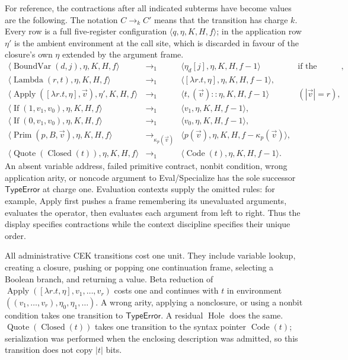 For reference, the contractions after all indicated subterms have become
values are the following.  The notation \(C\longrightarrow_k C'\) means that
the transition has charge \(k\).  Every row is a full five-register
configuration \(\langle q,\eta,K,H,f\rangle\); in the application row
\(\eta'\) is the ambient environment at the call site, which is discarded in
favour of the closure's own \(\eta\) extended by the argument frame.
\[
\begin{array}{rcll}
\langle\operatorname{BoundVar}(d,j),\eta,K,H,f\rangle
 &\longrightarrow_1&\langle\eta_d[j],\eta,K,H,f-1\rangle
 &\text{if the address exists},\\
\langle\operatorname{Lambda}(r,t),\eta,K,H,f\rangle
 &\longrightarrow_1&\langle[\lambda r.t,\eta],\eta,K,H,f-1\rangle,&\\
\langle\operatorname{Apply}([\lambda r.t,\eta],\vec v),\eta',K,H,f\rangle
 &\longrightarrow_1&\langle t,(\vec v)::\eta,K,H,f-1\rangle
 &(|\vec v|=r),\\
\langle\operatorname{If}(1,v_1,v_0),\eta,K,H,f\rangle
 &\longrightarrow_1&\langle v_1,\eta,K,H,f-1\rangle,&\\
\langle\operatorname{If}(0,v_1,v_0),\eta,K,H,f\rangle
 &\longrightarrow_1&\langle v_0,\eta,K,H,f-1\rangle,&\\
\langle\operatorname{Prim}(p,B,\vec v),\eta,K,H,f\rangle
 &\longrightarrow_{\kappa_p(\vec v)}&
 \langle p(\vec v),\eta,K,H,f-\kappa_p(\vec v)\rangle,&\\
\langle\operatorname{Quote}(\operatorname{Closed}(t)),\eta,K,H,f\rangle
 &\longrightarrow_1&\langle\operatorname{Code}(t),\eta,K,H,f-1\rangle.&
\end{array}
\tag{8.2}\label{eq:cek-core}
\]
An absent variable address, failed primitive contract, nonbit condition,
wrong application arity, or noncode argument to Eval/Specialize has the sole
successor \(\mathsf{TypeError}\) at charge one.  Evaluation contexts supply
the omitted rules: for example, Apply first pushes a frame remembering its
unevaluated arguments, evaluates the operator, then evaluates each argument
from left to right.  Thus the display specifies contractions while the context
discipline specifies their unique order.

All administrative CEK transitions cost one unit.  They include variable
lookup, creating a closure, pushing or popping one continuation frame,
selecting a Boolean branch, and returning a value.  Beta reduction of
\(\operatorname{Apply}([\lambda r.t,\eta],v_1,\ldots,v_r)\) costs one and
continues with \(t\) in environment
\(((v_1,\ldots,v_r),\eta_0,\eta_1,\ldots)\).  A wrong arity, applying a
nonclosure, or using a nonbit condition takes one transition to
\(\mathsf{TypeError}\).  A residual \(\operatorname{Hole}\) does the same.
\(\operatorname{Quote}(\operatorname{Closed}(t))\) takes one transition to the
syntax pointer \(\operatorname{Code}(t)\); serialization was performed when
the enclosing description was admitted, so this transition does not copy
\(|t|\) bits.


